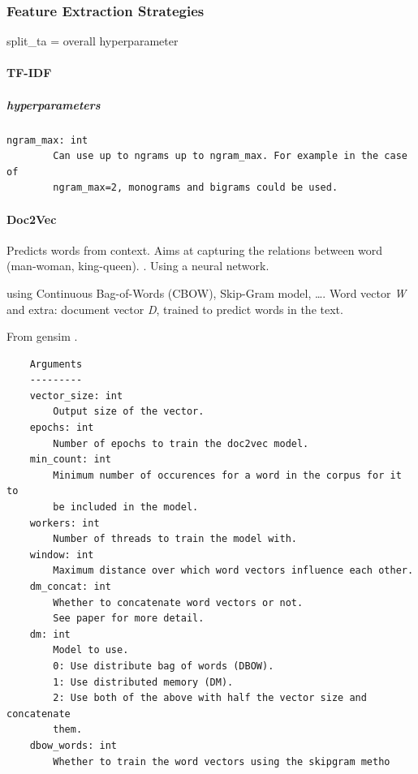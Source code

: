 \documentclass[
]{article}
\begin{document}
\hypertarget{feature-extraction-strategies}{%
\subsubsection{Feature Extraction
Strategies}\label{feature-extraction-strategies}}

split\_ta = overall hyperparameter

\hypertarget{tf-idf}{%
\paragraph{TF-IDF}\label{tf-idf}}

\hypertarget{hyperparameters}{%
\subparagraph{hyperparameters}\label{hyperparameters}}

\begin{verbatim}
ngram_max: int
        Can use up to ngrams up to ngram_max. For example in the case of
        ngram_max=2, monograms and bigrams could be used.
\end{verbatim}

\hypertarget{doc2vec}{%
\paragraph{Doc2Vec}\label{doc2vec}}

Predicts words from context. Aims at capturing the relations between
word (man-woman, king-queen). \autocite{Le2014}. Using a neural network.

using Continuous Bag-of-Words (CBOW), Skip-Gram model, \ldots. Word
vector \emph{W} and extra: document vector \emph{D}, trained to predict
words in the text.

From gensim \autocite{Rehurek2010}.

\begin{verbatim}
    Arguments
    ---------
    vector_size: int
        Output size of the vector.
    epochs: int
        Number of epochs to train the doc2vec model.
    min_count: int
        Minimum number of occurences for a word in the corpus for it to
        be included in the model.
    workers: int
        Number of threads to train the model with.
    window: int
        Maximum distance over which word vectors influence each other.
    dm_concat: int
        Whether to concatenate word vectors or not.
        See paper for more detail.
    dm: int
        Model to use.
        0: Use distribute bag of words (DBOW).
        1: Use distributed memory (DM).
        2: Use both of the above with half the vector size and concatenate
        them.
    dbow_words: int
        Whether to train the word vectors using the skipgram metho
        
        
\end{verbatim}
\end{document}
